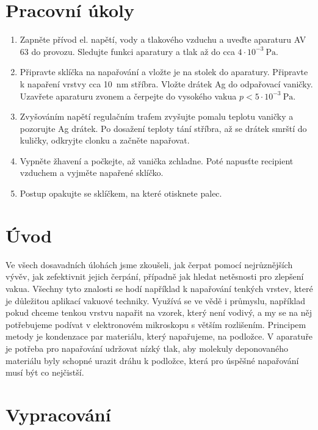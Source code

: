 \documentclass[english]{article}
\newcommand{\unit}[1]{~\mathrm{#1}}
\begin{document}


\setlength{\parindent}{0.5cm}

\section{Pracovní úkoly}

\begin{enumerate}
	\item Zapněte přívod el. napětí, vody a tlakového vzduchu a uveďte aparaturu AV 63 do provozu. Sledujte funkci aparatury a tlak až do cca $4\cdot 10^{-3}\unit{Pa}$.
	\item Připravte sklíčka na napařování a vložte je na stolek do aparatury. Připravte k napaření vrstvy cca 10~nm stříbra. Vložte drátek Ag do odpařovací vaničky. Uzavřete aparaturu zvonem a čerpejte do vysokého vakua $p < 5\cdot 10^{-3}\unit{Pa}$.
	\item Zvyšováním napětí regulačním trafem zvyšujte pomalu teplotu vaničky a pozorujte Ag drátek. Po dosažení teploty tání stříbra, až se drátek smrští do kuličky, odkryjte clonku a začněte napařovat.
	\item Vypněte žhavení a počkejte, až vanička zchladne. Poté napusťte recipient vzduchem a vyjměte napařené sklíčko.
	\item Postup opakujte se sklíčkem, na které otisknete palec.
\end{enumerate}

\section{Úvod}
	Ve všech dosavadních úlohách jsme zkoušeli, jak čerpat pomocí nejrůznějších vývěv, jak zefektivnit jejich čerpání, případně jak hledat netěsnosti pro zlepšení vakua. Všechny tyto znalosti se hodí například k napařování tenkých vrstev, které je důležitou aplikací vakuové techniky. Využívá se ve vědě i průmyslu, například pokud chceme tenkou vrstvu napařit na vzorek, který není vodivý, a my se na něj potřebujeme podívat v elektronovém mikroskopu s větším rozlišením. Principem metody je kondenzace par materiálu, který napařujeme, na podložce. V aparatuře je potřeba pro napařování udržovat nízký tlak, aby molekuly deponovaného materiálu byly schopné urazit dráhu k podložce, která pro úspěšné napařování musí být co nejčistší.

\section{Vypracování}
\end{document}
